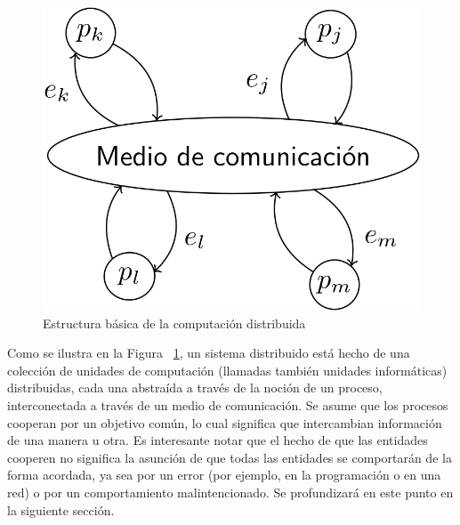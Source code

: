 \begin{figure}
  \centering
  \includegraphics[scale=0.18]{figures/distributed-systems.png}
  \caption{Estructura básica de la computación distribuida}
  \label{fig:distributed-systems}
\end{figure}


Como se ilustra en la Figura ~\ref{fig:distributed-systems}, un sistema distribuido está hecho de una
colección de unidades de computación (llamadas también unidades informáticas) distribuidas, cada una
abstraída a través de la noción de un proceso, interconectada a través de un medio de comunicación.
Se asume que los procesos cooperan por un objetivo común, lo cual significa que intercambian
información de una manera u otra. Es interesante notar que el hecho de que las entidades
cooperen no significa la asunción de que todas las entidades se comportarán de la forma
acordada, ya sea por un error (por ejemplo, en la programación o en una red) o por un comportamiento
malintencionado.
Se profundizará en este punto en la siguiente sección. %

